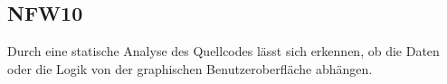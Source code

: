 \subsection*{NFW10}

Durch eine \gls{statische Analyse} des \Gls{Quellcode}s lässt sich erkennen, ob die Daten oder die Logik von der graphischen Benutzeroberfläche abhängen.